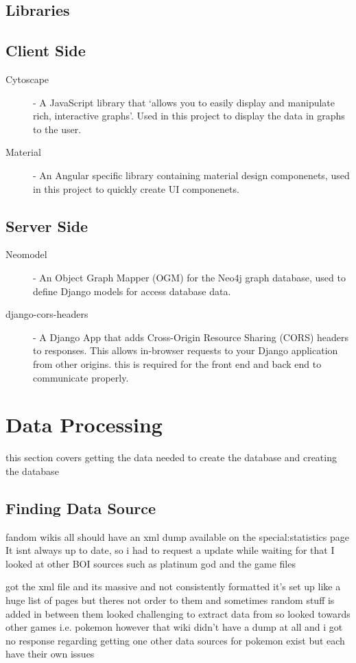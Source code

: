 \subsection{Libraries}
\subsection{Client Side}
\begin{description}
    \item[Cytoscape] - A JavaScript library that `allows you to easily display and manipulate rich, interactive graphs'\cite{franzCytoscapeJsGraph2016}. 
    Used in this project to display the data in graphs to the user.
    \item[Material] - An Angular specific library containing material design componenets, used in this project to quickly create UI componenets.
\end{description}
\subsection{Server Side}
\begin{description}
    \item[Neomodel] - An Object Graph Mapper (OGM) for the Neo4j graph database\cite{NeomodelDocumentationNeomodel}, used to define Django models for access database data.
    \item[django-cors-headers] - A Django App that adds Cross-Origin Resource Sharing (CORS) headers to responses. This allows in-browser requests to your Django application from other origins.\cite{yiuDjangocorsheadersDjangocorsheadersDjango} 
    this is required for the front end and back end to communicate properly.
\end{description}
\section{Data Processing}
this section covers getting the data needed to create the database and creating the database
\subsection{Finding Data Source}
fandom wikis all should have an xml dump available on the special:statistics page
It isnt always up to date, so i had to request a update
while waiting for that I looked at other BOI sources such as platinum god and the game files

got the xml file and its massive and not consistently formatted
it's set up like a huge list of pages but theres not order to them and sometimes random stuff is added in between them
looked challenging to extract data from so looked towards other games i.e. pokemon
however that wiki didn't have a dump at all and i got no response regarding getting one
other data sources for pokemon exist but each have their own issues
